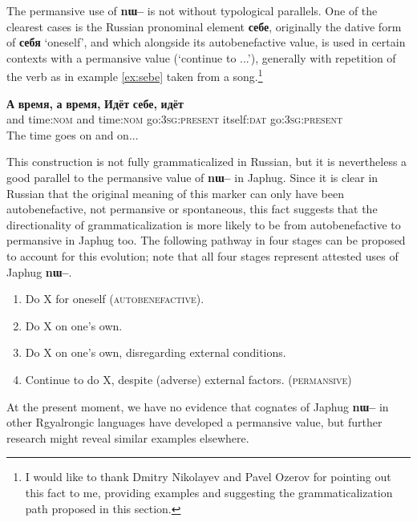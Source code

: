 \documentclass[oldfontcommands,oneside,a4paper,11pt]{article}
\newcommand{\ipa}[1]{\textbf{{\phon\mbox{#1}}}} %
\begin{document}
%

The permansive use of \ipa{nɯ--} is not without typological parallels. One of the clearest cases is the Russian pronominal element \ipa{себе}, originally the dative form of \ipa{себя} `oneself', and which alongside its autobenefactive value,  is used in certain contexts with a permansive value (`continue to ...'), generally with repetition of the verb as in example \ref{ex:sebe} taken from a song.\footnote{I would like to thank Dmitry Nikolayev and Pavel Ozerov for pointing out this fact to me, providing examples and suggesting the grammaticalization path proposed in this section.}
 
\begin{exe}
 \ex \label{ex:sebe}
 \gll
\ipa{А} 	\ipa{время,} 	\ipa{а} 	\ipa{время,} 	\ipa{Идёт} 	\ipa{себе,} 	\ipa{идёт} \\
 and time:\textsc{nom}  and time:\textsc{nom}  go:\textsc{3sg:present} itself:\textsc{dat} go:\textsc{3sg:present} \\
\glt The time goes on and on...
 \end{exe}

This construction is not fully grammaticalized in Russian, but it is nevertheless a good parallel to the permansive value of \ipa{nɯ--} in Japhug. Since it is clear in Russian that the original meaning of this marker can only have been autobenefactive, not permansive or spontaneous, this fact suggests that the directionality of grammaticalization is more likely to be from autobenefactive to permansive in Japhug too. The following pathway in four stages can be proposed to account for this evolution; note that all four stages represent attested uses of Japhug \ipa{nɯ--}.

\begin{enumerate}
\item Do X for oneself (\textsc{autobenefactive}).  
\item Do X on one's own.
\item Do X on one's own, disregarding external conditions.
\item Continue to do X, despite (adverse) external factors. (\textsc{permansive})
\end{enumerate}
 
At the present moment, we have no evidence that cognates of Japhug \ipa{nɯ--} in other Rgyalrongic languages have developed a permansive value, but further research might reveal similar examples elsewhere.
\end{document}
